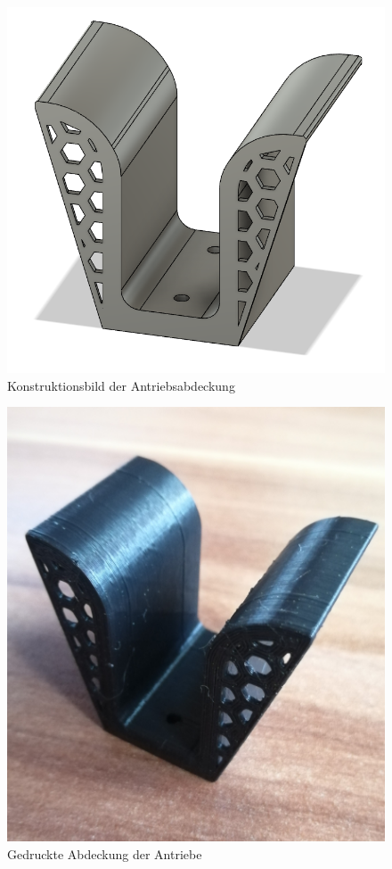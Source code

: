 \begin{minipage}[b]{0.49\textwidth}
\centering
\begin{figure}[H] %
\includegraphics[width=.7\textwidth]{sec2/images/3DAnbaukomponenten/Konstruktionsbilder/AntriebsabdeckungKonstruktion} 
\centering
\captionsetup{width=.9\textwidth}
\caption[Konstruktionsbild der Antriebsabdeckung]{Konstruktionsbild der Antriebsabdeckung}
\centering
\label{fig:KonstruktionAntriebsabdeckung}
\end{figure}
\end{minipage}
\begin{minipage}[b]{0.49\textwidth}
\begin{figure}[H] %
\includegraphics[width=.7\textwidth]{sec2/images/3DAnbaukomponenten/Druckbilder/AntriebsabdeckungDruck} 
\centering
\captionsetup{width=.9\textwidth}
\caption[Gedruckte Abdeckung der Antriebe]{Gedruckte Abdeckung der Antriebe}
\centering
\label{fig:DruckAntriebsabdeckung}
\end{figure}
\end{minipage}


